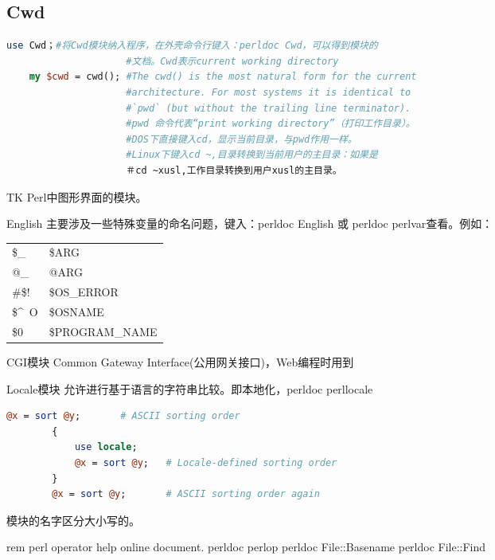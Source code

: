 \documentclass[a4paper,11pt]{book}
\begin{document}
\subsection{Cwd}
\begin{lstlisting}[language=perl]
    use	Cwd；#将Cwd模块纳入程序，在外壳命令行键入：perldoc Cwd，可以得到模块的
    				 #文档。Cwd表示current working directory
    my $cwd = cwd(); #The cwd() is the most natural form for the current 
                     #architecture. For most systems it is identical to 
                     #`pwd` (but without the trailing line terminator).
                     #pwd 命令代表“print working directory”（打印工作目录）。
                     #DOS下直接键入cd，显示当前目录，与pwd作用一样。
                     #Linux下键入cd ~,目录转换到当前用户的主目录：如果是
                     ＃cd ~xusl,工作目录转换到用户xusl的主目录。    
\end{lstlisting}
\begin{description*}
    \item [TK] Perl中图形界面的模块。    
    \item [English]主要涉及一些特殊变量的命名问题，键入：perldoc English 或
    		perldoc perlvar查看。例如：\\
                \begin{tabular}{ll}
                \$_ & \$ARG\\
                @_ & @ARG\\
    		\#\$! & \$OS_ERROR\\
                \$\^~O & \$OSNAME\\
                \$0 & \$PROGRAM_NAME\\
            \end{tabular}
    \item [CGI模块] Common Gateway Interface(公用网关接口)，Web编程时用到
    
    \item [Locale模块]允许进行基于语言的字符串比较。即本地化，perldoc  perllocale
        \begin{lstlisting}[language=perl]
        @x = sort @y;       # ASCII sorting order
        {
            use locale;
            @x = sort @y;   # Locale-defined sorting order
        }
        @x = sort @y;       # ASCII sorting order again
    \end{lstlisting} 
 		

\end{description*}
模块的名字区分大小写的。
 		
 		rem perl operator help online document.
 		perldoc perlop    
    perldoc File::Basename
    perldoc File::Find
\end{document}
